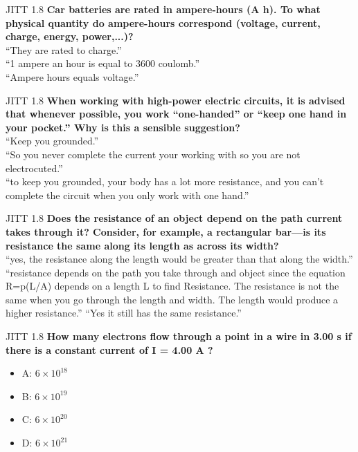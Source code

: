 \documentclass{beamer}
\begin{document}
\begin{frame}{JITT 1.8}
\textbf{Car batteries are rated in ampere-hours (A h). To what physical quantity do ampere-hours correspond (voltage, current, charge, energy, power,...)?} \\
``They are rated to charge.'' \\
``1 ampere an hour is equal to 3600 coulomb.'' \\
``Ampere hours equals voltage.''
\end{frame}

\begin{frame}{JITT 1.8}
\textbf{When working with high-power electric circuits, it is advised that whenever possible, you work “one-handed” or “keep one hand in your pocket.” Why is this a sensible suggestion?} \\
``Keep you grounded.'' \\
``So you never complete the current your working with so you are not electrocuted.'' \\
``to keep you grounded, your body has a lot more resistance, and you can't complete the circuit when you only work with one hand.''
\end{frame}

\begin{frame}{JITT 1.8}
\textbf{Does the resistance of an object depend on the path current takes through it? Consider, for example, a rectangular bar—is its resistance the same along its length as across its width?} \\
``yes, the resistance along the length would be greater than that along the width.'' \\
``resistance depends on the path you take through and object since the equation R=p(L/A) depends on a length L to find Resistance.  The resistance is not the same when you go through the length and width. The length would produce a higher resistance.''
``Yes it still has the same resistance.''
\end{frame}

\begin{frame}{JITT 1.8}
\textbf{How many electrons flow through a point in a wire in 3.00 s if there is a constant current of I = 4.00 A ?} \\
\begin{itemize}
\item A: $6 \times 10^{18}$
\item B: $6 \times 10^{19}$
\item C: $6 \times 10^{20}$
\item D: $6 \times 10^{21}$
\end{itemize}
\end{frame}
\end{document}

